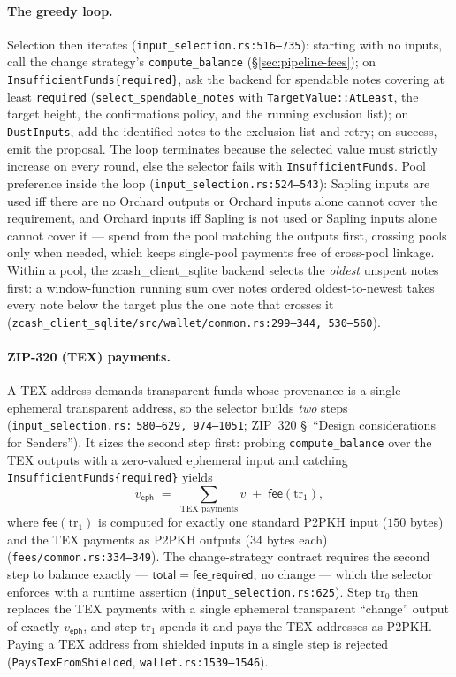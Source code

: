 \documentclass[11pt,a4paper]{article}
\theoremstyle{definition}
\begin{document}
\paragraph{The greedy loop.} Selection then iterates
(\texttt{input\_selection.rs:516--735}): starting with no inputs, call the
change strategy's \texttt{compute\_balance} (\S\ref{sec:pipeline-fees}); on
\texttt{InsufficientFunds\{required\}}, ask the backend for spendable notes
covering at least \texttt{required}
(\texttt{select\_spendable\_notes} with \texttt{TargetValue::AtLeast}, the
target height, the confirmations policy, and the running exclusion list); on
\texttt{DustInputs}, add the identified notes to the exclusion list and
retry; on success, emit the proposal. The loop terminates because the
selected value must strictly increase on every round, else the selector
fails with \texttt{InsufficientFunds}. Pool preference inside the loop
(\texttt{input\_selection.rs:524--543}): Sapling inputs are used iff there
are no Orchard outputs or Orchard inputs alone cannot cover the requirement,
and Orchard inputs iff Sapling is not used or Sapling inputs alone cannot
cover it --- spend from the pool matching the outputs first, crossing pools
only when needed, which keeps single-pool payments free of cross-pool
linkage. Within a pool, the \textsf{zcash\_client\_sqlite} backend selects
the \emph{oldest} unspent notes first: a window-function running sum over
notes ordered oldest-to-newest takes every note below the target plus the
one note that crosses it
(\texttt{zcash\_client\_sqlite/src/wallet/common.rs:299--344, 530--560}).

\paragraph{ZIP-320 (TEX) payments.} A TEX address demands transparent funds
whose provenance is a single ephemeral transparent address, so the selector
builds \emph{two} steps (\texttt{input\_selection.rs:}\allowbreak%
\texttt{580--629, 974--1051}; ZIP~320 \S~``Design considerations for
Senders''). It sizes the
second step first: probing \texttt{compute\_balance} over the TEX outputs with a
zero-valued ephemeral
input and catching \texttt{InsufficientFunds\{required\}} yields
\[
v_{\mathsf{eph}} \;=\; \sum_{\text{TEX payments}} v \;+\;
\mathsf{fee}(\mathrm{tr}_1),
\]
where $\mathsf{fee}(\mathrm{tr}_1)$ is computed for exactly one standard
P2PKH input ($150$ bytes) and the TEX payments as P2PKH outputs ($34$ bytes
each) (\texttt{fees/common.rs:334--349}). The change-strategy contract
requires the second step to balance exactly ---
$\mathsf{total} = \mathsf{fee\_required}$, no change --- which the selector
enforces with a runtime assertion (\texttt{input\_selection.rs:625}). Step
$\mathrm{tr}_0$ then replaces the TEX payments with a single ephemeral
transparent ``change'' output of exactly $v_{\mathsf{eph}}$, and step
$\mathrm{tr}_1$ spends it and pays the TEX addresses as P2PKH. Paying a TEX
address from shielded inputs in a single step is rejected
(\texttt{PaysTexFromShielded}, \texttt{wallet.rs:1539--1546}).
\end{document}
